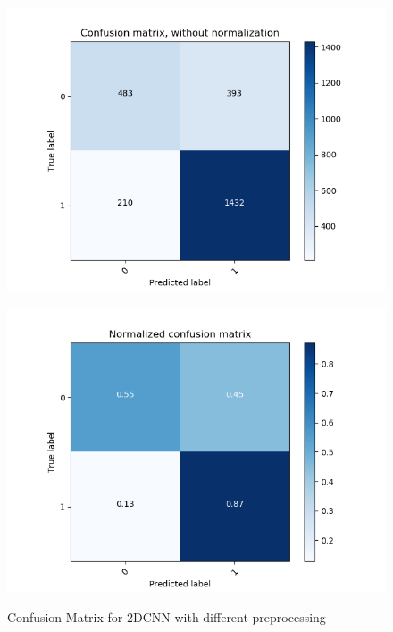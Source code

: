 \begin{figure}
\begin{minipage}[b]{0.45\columnwidth}
	\includegraphics[clip, width=\linewidth]{fig/chapter4/count_pretrain_True_he_True}
	\label{fig: count_pretrain_preprocess}
    \end{minipage}
	\begin{minipage}[b]{0.45\columnwidth}
		\centering
		\includegraphics[clip, width=\linewidth]{fig/chapter4/pretrain_True_he_True}
		\label{fig: pretrain_preprocess}
	\end{minipage}

	
	\caption{Confusion Matrix for 2DCNN with different preprocessing}
	\label{fig:2d_preprocess_matrix}
	
\end{figure}

